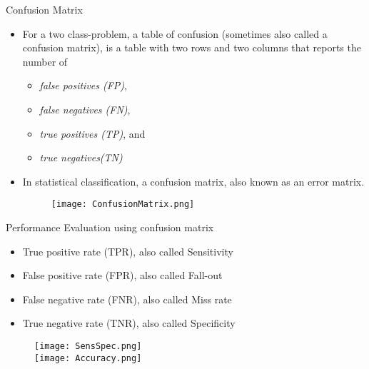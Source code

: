 \begin{frame}{Confusion Matrix}
\begin{itemize}

\item For a two class-problem, a table of confusion (sometimes also called a confusion matrix), is a table with two rows and two columns that reports the number of
\begin{itemize}
\item  \textit{\color{mycolor2}false positives (FP)}, 
\item \textit{\color{mycolor2} false negatives (FN)}, 
\item \textit{\color{mycolor2}true positives (TP)}, and 
\item \textit{\color{mycolor2}true negatives(TN)}
\end{itemize}

\item In statistical classification, a confusion matrix, also known as an error matrix.
\begin{figure}
\texttt{[image: ConfusionMatrix.png]}
\end{figure}
\end{itemize}
\end{frame}

\begin{frame}{Performance Evaluation using confusion matrix}
\begin{itemize}
\item True positive rate (TPR), also called Sensitivity
\item False positive rate (FPR), also called Fall-out
\item False negative rate (FNR), also called Miss rate
\item True negative rate (TNR), also called Specificity
\end{itemize}
\begin{figure}
\texttt{[image: SensSpec.png]}\\
\texttt{[image: Accuracy.png]}
\end{figure}
\end{frame}


